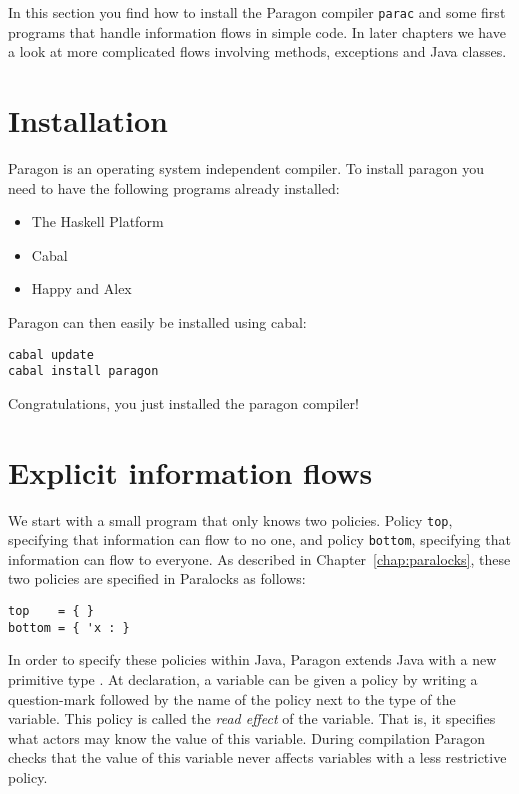 In this section you find how to install the Paragon compiler \texttt{parac}
and some first programs that handle information flows in simple code. In later
chapters we have a look at more complicated flows involving methods, exceptions
and Java classes.

\section{Installation}

Paragon is an operating system independent compiler. To install paragon you need
to have the following programs already installed:

\begin{itemize}

  \item The Haskell Platform
  
  \item Cabal
  
  \item Happy and Alex

\end{itemize}

Paragon can then easily be installed using cabal:

\begin{lstlisting}
cabal update
cabal install paragon
\end{lstlisting}

Congratulations, you just installed the paragon compiler!

\section{Explicit information flows}

We start with a small program that only knows two policies. Policy 
\texttt{top}, specifying that information can flow to no one, and policy
\texttt{bottom}, specifying that information can flow to everyone. As described
in Chapter~\ref{chap:paralocks}, these two policies are specified in Paralocks as
follows:

\begin{lstlisting}
top    = { }
bottom = { 'x : }
\end{lstlisting}

In order to specify these policies within Java, Paragon extends Java with a new
primitive type . At declaration, 
a variable can be given a policy by writing a 
question-mark followed by the name of the policy next to the type of 
the variable. This policy is called the \emph{read effect} of the variable.
That is, it specifies what actors may know the value of this variable. During
compilation Paragon checks that the value of this variable never affects 
variables with a less restrictive policy.

